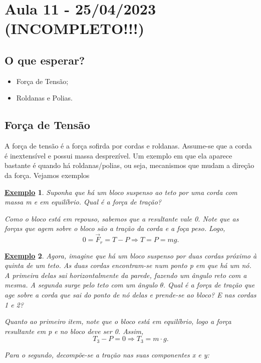 \documentclass{article}
\newtheorem{example}{\underline{Exemplo}}
\begin{document}
\section{Aula 11 - 25/04/2023 (INCOMPLETO!!!)}
\subsection{O que esperar?}
\begin{itemize}
  \item For\c ca de Tens\~ao;
  \item Roldanas e Polias.
\end{itemize}

\subsection{For\c ca de Tens\~ao}
  A for\c ca de tens\~ao \'e a for\c ca sofirda por cordas e roldanas. Assume-se que a corda \'e inextens\'ivel e possui massa 
  desprez\'ivel. Um exemplo em que ela aparece bastante \'e quando h\'a roldanas/polias, ou seja, mecanismos que mudam a dire\c c\~ao
  da for\c ca. Vejamos exemplos
 \begin{example}
   Suponha que h\'a um bloco suspenso ao teto por uma corda com massa m e em equil\'ibrio. Qual \'e a for\c ca de tra\c c\~ao?

   Como o bloco est\'a em repouso, sabemos que a resultante vale 0. Note que as for\c cas que agem sobre o bloco s\~ao a tra\c c\~ao
   da corda e a fo\c ca peso. Logo, 
     $$
       0 = \vec{F}_{r} = T - P \Rightarrow T = P = mg.
     $$
 \end{example}
\begin{example}
    Agora, imagine que h\'a um bloco suspenso por duas cordas pr\'oximo \`a quinta de um teto. As duas cordas encontram-se num
  ponto p em que h\'a um n\'o. A primeira delas sai horizontalmente da parede, fazendo um \^angulo reto com a mesma. A segunda
  surge pelo teto com um \^angulo $\theta .$ Qual \'e a for\c ca de tra\c c\~ao que age sobre a corda que sai do ponto de n\'o
  delas e prende-se ao bloco? E nas cordas 1 e 2?

  Quanto ao primeiro item, note que o bloco est\'a em equil\'ibrio, logo a for\c ca resultante em p e no bloco deve ser 0.
  Assim, 
    $$
      T_{3}-P = 0 \Rightarrow  T_{3} = m \cdot g.
    $$

  Para o segundo, decomp\~oe-se a tra\c c\~ao nas suas componentes x e y:
\end{example}
\end{document}
